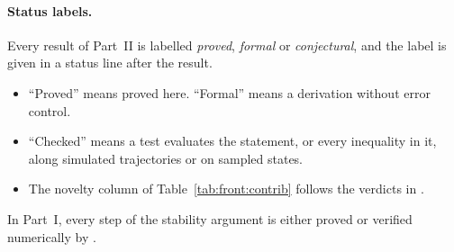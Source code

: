 \paragraph{Status labels.} Every result of Part~II is labelled \emph{proved}, \emph{formal} or
\emph{conjectural}, and the label is given in a status line after the result.
\begin{itemize}
  \item ``Proved'' means proved here. ``Formal'' means a derivation without error control.
  \item ``Checked'' means a test evaluates the statement, or every inequality in it, along simulated trajectories or
    on sampled states.
  \item The novelty column of Table~\ref{tab:front:contrib} follows the verdicts in .
\end{itemize}
In Part~I, every step of the stability argument is either proved or verified numerically by
.

